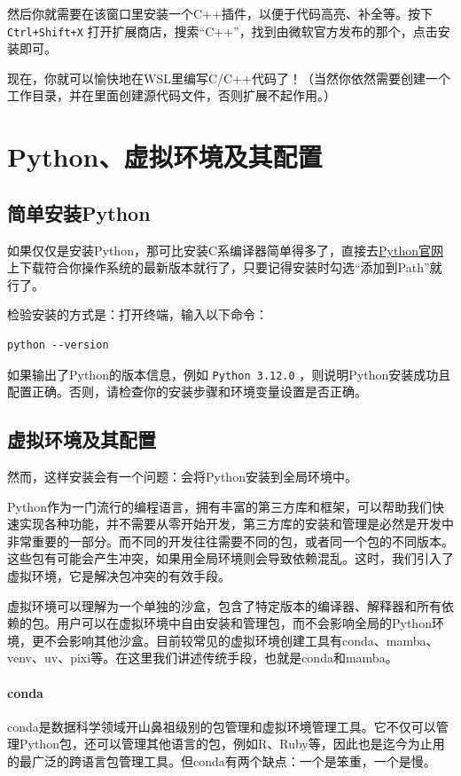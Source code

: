 然后你就需要在该窗口里安装一个C++插件，以便于代码高亮、补全等。按下 \texttt{Ctrl+Shift+X} 打开扩展商店，搜索“C++”，找到由微软官方发布的那个，点击安装即可。

现在，你就可以愉快地在WSL里编写C/C++代码了！（当然你依然需要创建一个工作目录，并在里面创建源代码文件，否则扩展不起作用。）

\section{Python、虚拟环境及其配置}\label{sec:conda}

\subsection{简单安装Python}

如果仅仅是安装Python，那可比安装C系编译器简单得多了，直接去\href{https://www.python.org/downloads/}{Python官网}上下载符合你操作系统的最新版本就行了，只要记得安装时勾选“添加到Path”就行了。

检验安装的方式是：打开终端，输入以下命令：
\begin{verbatim}
python --version
\end{verbatim}
如果输出了Python的版本信息，例如 \texttt{Python 3.12.0} ，则说明Python安装成功且配置正确。否则，请检查你的安装步骤和环境变量设置是否正确。

\subsection{虚拟环境及其配置}

然而，这样安装会有一个问题：会将Python安装到全局环境中。

Python作为一门流行的编程语言，拥有丰富的第三方库和框架，可以帮助我们快速实现各种功能，并不需要从零开始开发，第三方库的安装和管理是必然是开发中非常重要的一部分。而不同的开发往往需要不同的包，或者同一个包的不同版本。这些包有可能会产生冲突，如果用全局环境则会导致依赖混乱。这时，我们引入了虚拟环境，它是解决包冲突的有效手段。

虚拟环境可以理解为一个单独的沙盒，包含了特定版本的编译器、解释器和所有依赖的包。用户可以在虚拟环境中自由安装和管理包，而不会影响全局的Python环境，更不会影响其他沙盒。目前较常见的虚拟环境创建工具有conda、mamba、venv、uv、pixi等。在这里我们讲述传统手段，也就是conda和mamba。

\paragraph{conda} conda是数据科学领域开山鼻祖级别的包管理和虚拟环境管理工具。它不仅可以管理Python包，还可以管理其他语言的包，例如R、Ruby等，因此也是迄今为止用的最广泛的跨语言包管理工具。但conda有两个缺点：一个是笨重，一个是慢。

